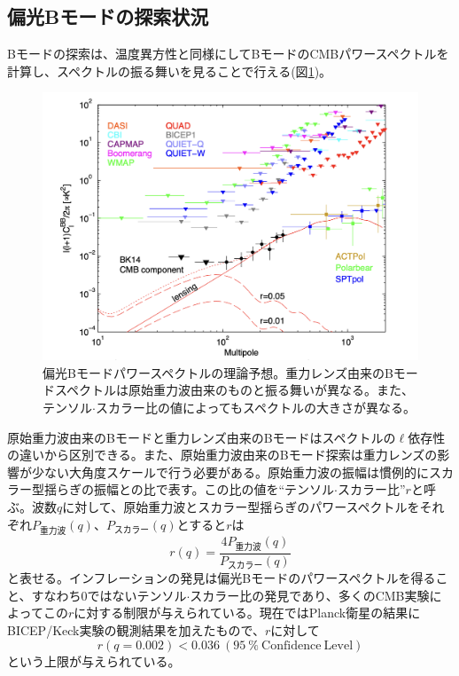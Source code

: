 \subsection{偏光Bモードの探索状況}
Bモードの探索は、温度異方性と同様にしてBモードのCMBパワースペクトルを計算し、スペクトルの振る舞いを見ることで行える(図\ref{bicep_paper})。
\begin{figure}[htbp]
  \centering
  \includegraphics[width=0.8\columnwidth]{2_cosmology/figs/bicep_ref.png}
  \caption{偏光Bモードパワースペクトルの理論予想\cite{bicep_Bmode}。重力レンズ由来のBモードスペクトルは原始重力波由来のものと振る舞いが異なる。また、テンソル$\cdot$スカラー比の値によってもスペクトルの大きさが異なる。}
  \label{bicep_paper}
\end{figure}
原始重力波由来のBモードと重力レンズ由来のBモードはスペクトルの$\ell$依存性の違いから区別できる。また、原始重力波由来のBモード探索は重力レンズの影響が少ない大角度スケールで行う必要がある。原始重力波の振幅は慣例的にスカラー型揺らぎの振幅との比で表す。この比の値を``テンソル$\cdot$スカラー比''$r$と呼ぶ。波数$q$に対して、原始重力波とスカラー型揺らぎのパワースペクトルをそれぞれ$P_{重力波}(q)$、$P_{スカラー}(q)$とすると$r$は
\begin{equation}
  r(q) = \frac{4P_{重力波}(q)}{P_{スカラー}(q)}
\end{equation}
と表せる。インフレーションの発見は偏光Bモードのパワースペクトルを得ること、すなわち0ではないテンソル$\cdot$スカラー比の発見であり、多くのCMB実験によってこの$r$に対する制限が与えられている。現在ではPlanck衛星の結果にBICEP/Keck実験の観測結果を加えたもので、$r$に対して
\begin{equation}
  r(q=0.002) < 0.036 ~ (\SI{95}{\%} ~\mathrm{Confidence~Level})
\end{equation}
という上限が与えられている\cite{const_r}。
